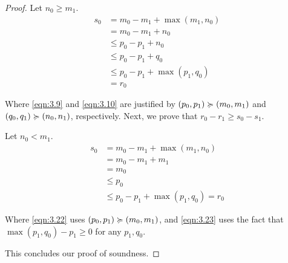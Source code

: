 \begin{proof}
   Let \(n_0 \geq m_1\).
   \begin{align}
      s_0   &= m_0 - m_1 + \max(m_1, n_0) \\
            &= m_0 - m_1 + n_0 \\
            &\leq p_0 - p_1 + n_0 \label{eqn:3.9}\\
            &\leq p_0 - p_1 + q_0 \label{eqn:3.10}\\
            &\leq p_0 - p_1 + \max(p_1, q_0) \\
            &= r_0
   \end{align}
   
   Where \cref{eqn:3.9} and \cref{eqn:3.10} are justified by \((p_0, p_1) \succcurlyeq (m_0, m_1)\) and \((q_0, q_1) \succcurlyeq (n_0, n_1)\), respectively. Next, we prove that \(r_0 - r_1 \geq s_0 - s_1\).

   Let \(n_0 < m_1\). 
   \begin{align}
      s_0   &= m_0 - m_1 + \max(m_1, n_0) \\
            &= m_0 - m_1 + m_1 \\
            &= m_0 \\
            &\leq p_0 \label{eqn:3.22}\\
            &\leq p_0 - p_1 + \max(p_1, q_0) = r_0 \label{eqn:3.23}
   \end{align}

   Where \cref{eqn:3.22} uses \((p_0, p_1) \succcurlyeq (m_0, m_1)\), and \cref{eqn:3.23} uses the fact that \(\max(p_1, q_0) - p_1 \geq 0\) for any \(p_1, q_0\).

   This concludes our proof of soundness.
\end{proof}
